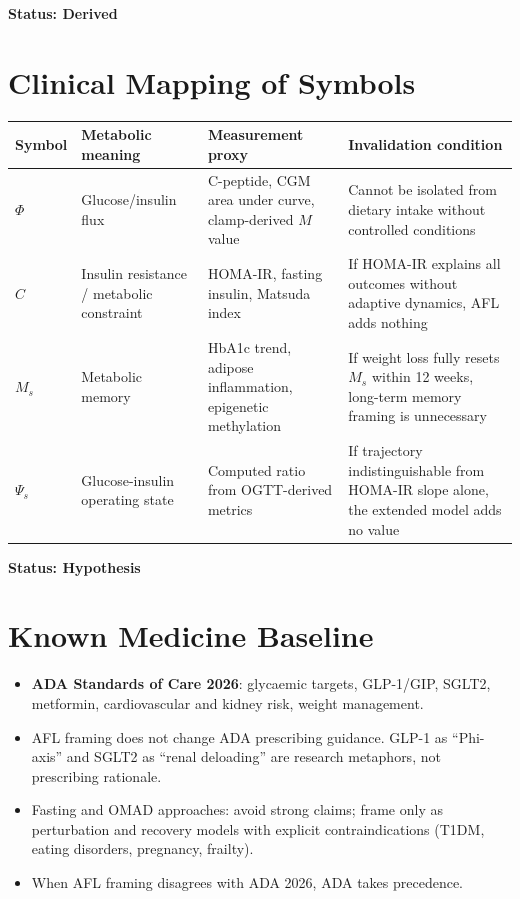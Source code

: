\documentclass[11pt]{article}
\begin{document}
\textbf{Status: Derived}


\section{Clinical Mapping of Symbols}

\begin{center}
\begin{tabular}{p{1.5cm}p{3.0cm}p{3.5cm}p{4.5cm}}
\toprule
Symbol & Metabolic meaning & Measurement proxy & Invalidation condition \\
\midrule
$\Phi$ & Glucose/insulin flux & C-peptide, CGM area under curve, clamp-derived $M$ value & Cannot be isolated from dietary intake without controlled conditions \\
$C$ & Insulin resistance / metabolic constraint & HOMA-IR, fasting insulin, Matsuda index & If HOMA-IR explains all outcomes without adaptive dynamics, AFL adds nothing \\
$M_s$ & Metabolic memory & HbA1c trend, adipose inflammation, epigenetic methylation & If weight loss fully resets $M_s$ within 12 weeks, long-term memory framing is unnecessary \\
$\Psi_s$ & Glucose-insulin operating state & Computed ratio from OGTT-derived metrics & If trajectory indistinguishable from HOMA-IR slope alone, the extended model adds no value \\
\bottomrule
\end{tabular}
\end{center}

\textbf{Status: Hypothesis}

\section{Known Medicine Baseline}

\begin{itemize}
    \item \textbf{ADA Standards of Care 2026}: glycaemic targets, GLP-1/GIP, SGLT2, metformin, cardiovascular and kidney risk, weight management.
    \item AFL framing does not change ADA prescribing guidance. GLP-1 as ``Phi-axis'' and SGLT2 as ``renal deloading'' are research metaphors, not prescribing rationale.
    \item Fasting and OMAD approaches: avoid strong claims; frame only as perturbation and recovery models with explicit contraindications (T1DM, eating disorders, pregnancy, frailty).
    \item When AFL framing disagrees with ADA 2026, ADA takes precedence.
\end{itemize}
\end{document}
